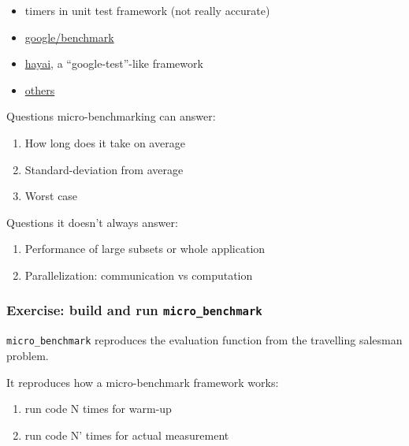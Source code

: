 \begin{itemize}
\itemsep1pt\parskip0pt
\item
  timers in unit test framework (not really accurate)
\item
  \href{https://github.com/google/benchmark}{google/benchmark}
\item
  \href{https://github.com/nickbruun/hayai}{hayai}, a
  ``google-test''-like framework
\item
  \href{http://www.bfilipek.com/2016/01/micro-benchmarking-libraries-for-c.html}{others}
\end{itemize}

Questions micro-benchmarking can answer:

\begin{enumerate}
\def\labelenumi{\arabic{enumi}.}
\itemsep1pt\parskip0pt
\item
  How long does it take on average
\item
  Standard-deviation from average
\item
  Worst case
\end{enumerate}

Questions it doesn't always answer:

\begin{enumerate}
\def\labelenumi{\arabic{enumi}.}
\itemsep1pt\parskip0pt
\item
  Performance of large subsets or whole application
\item
  Parallelization: communication vs computation
\end{enumerate}

\subsubsection{Exercise: build and run
\texttt{micro\_benchmark}}\label{exercise-build-and-run-microux5fbenchmark}

\texttt{micro\_benchmark} reproduces the evaluation function from the
travelling salesman problem.

It reproduces how a micro-benchmark framework works:

\begin{enumerate}
\def\labelenumi{\arabic{enumi}.}
\itemsep1pt\parskip0pt
\item
  run code N times for warm-up
\item
  run code N' times for actual measurement
\end{enumerate}

